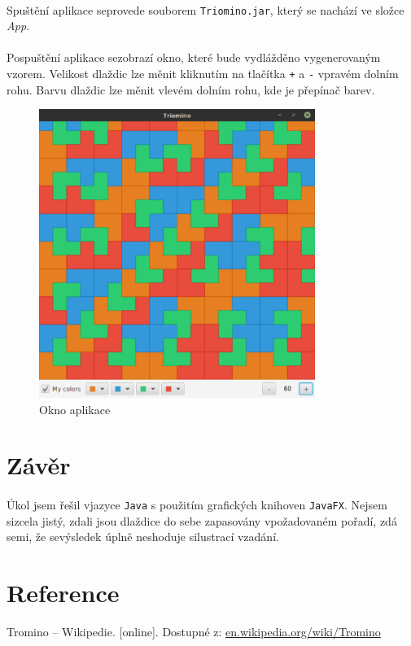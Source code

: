 \documentclass[12pt]{scrartcl}
\begin{document}
\paragraph{}
Spuštění aplikace se\nobreakspace provede souborem \texttt{Triomino.jar}, který se nachází ve složce \emph{App}.

\paragraph{}
Po\nobreakspace spuštění aplikace se\nobreakspace zobrazí okno, které bude vydlážděno vygenerovaným vzorem. Velikost dlaždic lze měnit kliknutím na tlačítka \texttt{+} a \texttt{-} v\nobreakspace pravém dolním rohu. Barvu dlaždic lze měnit v\nobreakspace levém dolním rohu, kde je přepínač barev.	

\begin{figure}[!ht]
	\centering
	\label{obr:polekolizi}
	\includegraphics[width=0.8\textwidth,natwidth=1,natheight=1]{app_gui.pdf}
	\caption{Okno aplikace}
\end{figure}

\newpage
\section{Závěr}
\paragraph{}
Úkol jsem řešil v\nobreakspace jazyce \texttt{Java} s použitím grafických knihoven \texttt{JavaFX}.
Nejsem si\nobreakspace zcela jistý, zdali jsou dlaždice do sebe zapasovány v\nobreakspace požadovaném pořadí, zdá se\nobreakspace mi, že se\nobreakspace výsledek úplně neshoduje s\nobreakspace ilustrací v\nobreakspace zadání.

\section{Reference}

Tromino – Wikipedie. [online]. Dostupné z: \href{https://en.wikipedia.org/wiki/Tromino}{en.wikipedia.org/wiki/Tromino}
\end{document}
